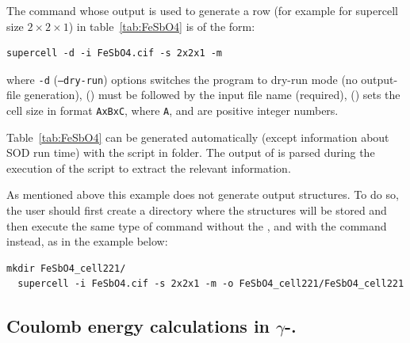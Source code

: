 \documentclass[a4paper,10pt]{article}
\begin{document}
The \sups{} command whose output is used to generate a row (for example for supercell size $2\times2\times1$) in table~\ref{tab:FeSbO4} is of the form:
\begin{Verbatim}[breaklines]
  supercell -d -i FeSbO4.cif -s 2x2x1 -m 
\end{Verbatim}
where \texttt{-d} (\texttt{--dry-run}) options switches the program to dry-run mode (no output-file generation),  () must be followed by the input file name (required),  () sets the cell size in format \texttt{AxBxC}, where \texttt{A},  and  are positive integer numbers.

Table~\ref{tab:FeSbO4} can be generated automatically (except information about SOD run time) with the script \linebreak {} in  folder. The output of \sups{} is parsed during the execution of the script to extract the relevant information.

As mentioned above this example does not generate output structures. To do so, the user should first create a directory where the structures will be stored and then execute the same type of \sups{} command without the , and with the  command instead, as in the example below:
\begin{Verbatim}[breaklines]
  mkdir FeSbO4_cell221/
  supercell -i FeSbO4.cif -s 2x2x1 -m -o FeSbO4_cell221/FeSbO4_cell221
\end{Verbatim}

\subsection*{Coulomb energy calculations in $\gamma$-.}
\end{document}
